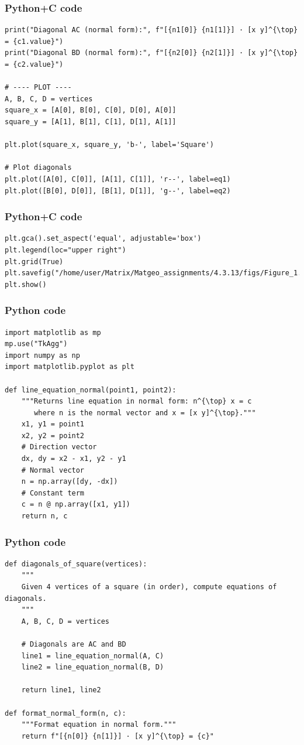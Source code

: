 \documentclass{beamer}
\begin{document}
\begin{frame}[fragile]
    \frametitle{Python+C code}

    \begin{lstlisting}
print("Diagonal AC (normal form):", f"[{n1[0]} {n1[1]}] · [x y]^{\top} = {c1.value}")
print("Diagonal BD (normal form):", f"[{n2[0]} {n2[1]}] · [x y]^{\top} = {c2.value}")

# ---- PLOT ----
A, B, C, D = vertices
square_x = [A[0], B[0], C[0], D[0], A[0]]
square_y = [A[1], B[1], C[1], D[1], A[1]]

plt.plot(square_x, square_y, 'b-', label='Square')

# Plot diagonals
plt.plot([A[0], C[0]], [A[1], C[1]], 'r--', label=eq1)
plt.plot([B[0], D[0]], [B[1], D[1]], 'g--', label=eq2)

    \end{lstlisting}
\end{frame}

\begin{frame}[fragile]
    \frametitle{Python+C code}

    \begin{lstlisting}
plt.gca().set_aspect('equal', adjustable='box')
plt.legend(loc="upper right")
plt.grid(True)
plt.savefig("/home/user/Matrix/Matgeo_assignments/4.3.13/figs/Figure_1.png")
plt.show()
    \end{lstlisting}
\end{frame}


\begin{frame}[fragile]
    \frametitle{Python code}

    \begin{lstlisting}
import matplotlib as mp
mp.use("TkAgg")
import numpy as np
import matplotlib.pyplot as plt

def line_equation_normal(point1, point2):
    """Returns line equation in normal form: n^{\top} x = c
       where n is the normal vector and x = [x y]^{\top}."""
    x1, y1 = point1
    x2, y2 = point2
    # Direction vector
    dx, dy = x2 - x1, y2 - y1
    # Normal vector
    n = np.array([dy, -dx])
    # Constant term
    c = n @ np.array([x1, y1])
    return n, c
    \end{lstlisting}
\end{frame}

\begin{frame}[fragile]
    \frametitle{Python code}

    \begin{lstlisting}
def diagonals_of_square(vertices):
    """
    Given 4 vertices of a square (in order), compute equations of diagonals.
    """
    A, B, C, D = vertices
    
    # Diagonals are AC and BD
    line1 = line_equation_normal(A, C)
    line2 = line_equation_normal(B, D)
    
    return line1, line2

def format_normal_form(n, c):
    """Format equation in normal form."""
    return f"[{n[0]} {n[1]}] · [x y]^{\top} = {c}"

    \end{lstlisting}
\end{frame}
\end{document}
